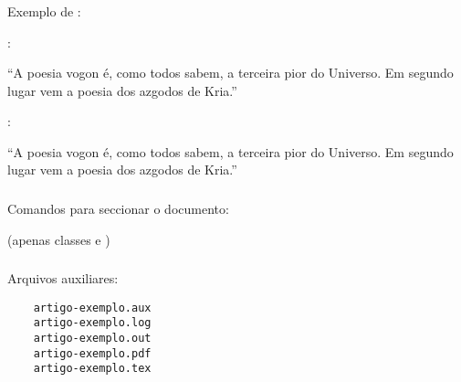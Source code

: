 \begin{frame}
  \frametitle{}
  \Large
  Exemplo de \texttt{\frenchspacing}:

  \vspace{1em}
  \begin{minipage}{.45\textwidth}
    \nonfrenchspacing
    \texttt{\nonfrenchspacing}:

    “A poesia vogon é, como todos sabem, a terceira pior do Universo. Em segundo
    lugar vem a poesia dos azgodos de Kria.”
  \end{minipage}
  \hspace{.05\textwidth}
  \begin{minipage}{.45\textwidth}
    \frenchspacing
    \texttt{\frenchspacing}:

    “A poesia vogon é, como todos sabem, a terceira pior do Universo. Em segundo
    lugar vem a poesia dos azgodos de Kria.”
  \end{minipage}
\end{frame}

\begin{frame}
  \frametitle{}
  \Large
  Comandos para seccionar o documento:

  \begin{itemize}
     (apenas classes  e
    )
  \end{itemize}
\end{frame}

\begin{frame}[fragile]
  \frametitle{}
  \LARGE
  Arquivos auxiliares:

  \begin{verbatim}
    artigo-exemplo.aux
    artigo-exemplo.log
    artigo-exemplo.out
    artigo-exemplo.pdf
    artigo-exemplo.tex
  \end{verbatim}
\end{frame}

